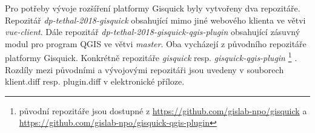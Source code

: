 \newpage
Pro potřeby vývoje rozšíření platformy Gisquick byly vytvořeny dva repozitáře. 
Repozitář \textit{dp-tethal-2018-gisquick}
obsahující mimo jiné webového klienta ve větvi \textit{vue-client}.
Dále repozitář \textit{dp-tethal-2018-gisquick-qgis-plugin} obsahující zásuvný 
modul pro program QGIS ve větvi \textit{master}.
Oba vycházejí z původního repozitáře platformy Gisquick. Konkrétně 
repozitáře \textit{gisquick} resp. \textit{gisquick-qgis-plugin}
\footnote{původní repozitáře jsou dostupné z \url{https://github.com/gislab-npo/gisquick} a \newline \url{https://github.com/gislab-npo/gisquick-qgis-plugin}}
.
\newline
Rozdíly mezi původními a vývojovými repozitáři jsou uvedeny v 
souborech klient.diff resp. plugin.diff v elektronické příloze. 

